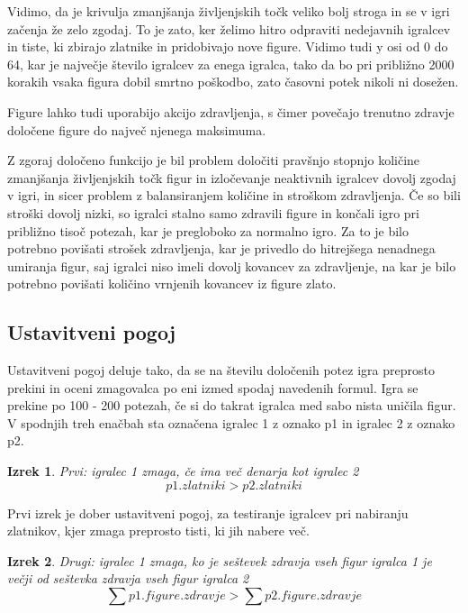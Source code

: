 \documentclass[a4paper, 12pt]{book}
\newtheorem{izrek}{Izrek}[chapter]
\begin{document}
Vidimo, da je krivulja zmanjšanja življenjskih točk veliko bolj stroga in se v igri začenja že zelo zgodaj. 
To je zato, ker želimo hitro odpraviti nedejavnih igralcev in tiste, ki zbirajo zlatnike in pridobivajo nove figure.
Vidimo tudi y osi od 0 do 64, kar je največje število igralcev za enega igralca, tako da bo pri približno 2000 korakih vsaka figura dobil smrtno poškodbo, zato časovni potek nikoli ni dosežen.

Figure lahko tudi uporabijo akcijo zdravljenja, s čimer povečajo trenutno zdravje določene figure do največ njenega maksimuma.
	
Z zgoraj določeno funkcijo je bil problem določiti pravšnjo stopnjo količine zmanjšanja življenjskih točk figur in izločevanje neaktivnih igralcev dovolj zgodaj v igri, in sicer problem z balansiranjem količine in stroškom zdravljenja. 
Če so bili stroški dovolj nizki, so igralci stalno samo zdravili figure in končali igro pri približno tisoč potezah, kar je pregloboko za normalno igro.
Za to je bilo potrebno povišati strošek zdravljenja, kar je privedlo do hitrejšega nenadnega umiranja figur, saj igralci niso imeli dovolj kovancev za zdravljenje, na kar je bilo potrebno povišati količino vrnjenih kovancev iz figure zlato.

\subsection{Ustavitveni pogoj}
Ustavitveni pogoj deluje tako, da se na številu določenih potez igra preprosto prekini in oceni zmagovalca po eni izmed spodaj navedenih formul.
Igra se prekine po 100 - 200 potezah, če si do takrat igralca med sabo nista uničila figur.
V spodnjih treh enačbah sta označena igralec 1 z oznako p1 in igralec 2 z oznako p2.

\begin{izrek}
	\label{ustavitvenipogoj1}
Prvi: igralec 1 zmaga, če ima več denarja kot igralec 2
	\begin{equation}
p1.zlatniki > p2.zlatniki
	\label{eq:ustavitvenipogoj1}
	\end{equation}
\end{izrek}

Prvi izrek je dober ustavitveni pogoj, za testiranje igralcev pri nabiranju zlatnikov, kjer zmaga preprosto tisti, ki jih nabere več.

\begin{izrek}
	\label{ustavitvenipogoj2}
Drugi: igralec 1 zmaga, ko je seštevek zdravja vseh figur igralca 1 je večji od seštevka zdravja vseh figur igralca 2
	\begin{equation}
	\sum{p1.figure.zdravje} > \sum{p2.figure.zdravje}
	\label{eq:ustavitvenipogoj2}
	\end{equation}
\end{izrek}
\end{document}
